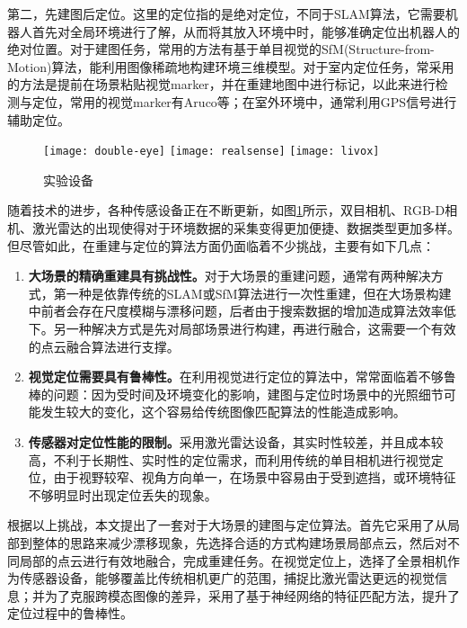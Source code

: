 第二，先建图后定位。这里的定位指的是绝对定位，不同于SLAM算法，它需要机器人首先对全局环境进行了解，从而将其放入环境中时，能够准确定位出机器人的绝对位置。对于建图任务，常用的方法有基于单目视觉的SfM(Structure-from-Motion)算法，能利用图像稀疏地构建环境三维模型。对于室内定位任务，常采用的方法是提前在场景粘贴视觉marker，并在重建地图中进行标记，以此来进行检测与定位\cite{babinec2014visual, zheng2018visual}，常用的视觉marker有Aruco\cite{garrido2014automatic}等；在室外环境中，通常利用GPS信号进行辅助定位\cite{reina2007adaptive}。
\begin{figure}
	\centering
	{\texttt{[image: double-eye]}}
	{\texttt{[image: realsense]}}
	{\texttt{[image: livox]}}
	\caption{实验设备}
	\label{sensor}
\end{figure}

随着技术的进步，各种传感设备正在不断更新，如图\ref{sensor}所示，双目相机、RGB-D相机、激光雷达的出现使得对于环境数据的采集变得更加便捷、数据类型更加多样。但尽管如此，在重建与定位的算法方面仍面临着不少挑战，主要有如下几点：
\begin{enumerate}
	\item \textbf{大场景的精确重建具有挑战性。}对于大场景的重建问题，通常有两种解决方式，第一种是依靠传统的SLAM或SfM算法进行一次性重建，但在大场景构建中前者会存在尺度模糊与漂移问题\cite{huang2019survey}，后者由于搜索数据的增加造成算法效率低下。另一种解决方式是先对局部场景进行构建，再进行融合，这需要一个有效的点云融合算法进行支撑。
	\item \textbf{视觉定位需要具有鲁棒性。}在利用视觉进行定位的算法中，常常面临着不够鲁棒的问题：因为受时间及环境变化的影响，建图与定位时场景中的光照细节可能发生较大的变化，这个容易给传统图像匹配算法的性能造成影响。
	\item \textbf{传感器对定位性能的限制。}采用激光雷达设备，其实时性较差，并且成本较高，不利于长期性、实时性的定位需求，而利用传统的单目相机进行视觉定位，由于视野较窄、视角方向单一，在场景中容易由于受到遮挡，或环境特征不够明显时出现定位丢失的现象。
\end{enumerate}

根据以上挑战，本文提出了一套对于大场景的建图与定位算法。首先它采用了从局部到整体的思路来减少漂移现象，先选择合适的方式构建场景局部点云，然后对不同局部的点云进行有效地融合，完成重建任务。在视觉定位上，选择了全景相机作为传感器设备，能够覆盖比传统相机更广的范围，捕捉比激光雷达更远的视觉信息；并为了克服跨模态图像的差异，采用了基于神经网络的特征匹配方法，提升了定位过程中的鲁棒性。


